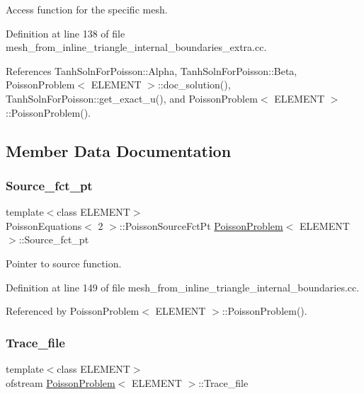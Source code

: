 Access function for the specific mesh. 



Definition at line 138 of file mesh\+\_\+from\+\_\+inline\+\_\+triangle\+\_\+internal\+\_\+boundaries\+\_\+extra.\+cc.



References Tanh\+Soln\+For\+Poisson\+::\+Alpha, Tanh\+Soln\+For\+Poisson\+::\+Beta, Poisson\+Problem$<$ E\+L\+E\+M\+E\+N\+T $>$\+::doc\+\_\+solution(), Tanh\+Soln\+For\+Poisson\+::get\+\_\+exact\+\_\+u(), and Poisson\+Problem$<$ E\+L\+E\+M\+E\+N\+T $>$\+::\+Poisson\+Problem().



\subsection{Member Data Documentation}
\mbox{\label{classPoissonProblem_a2ba5bb705abab012b72bbd7f4016d5fe}} 
\subsubsection{\texorpdfstring{Source\+\_\+fct\+\_\+pt}{Source\_fct\_pt}}
{\footnotesize\ttfamily template$<$class E\+L\+E\+M\+E\+NT$>$ \\
Poisson\+Equations$<$ 2 $>$\+::Poisson\+Source\+Fct\+Pt \hyperlink{classPoissonProblem}{Poisson\+Problem}$<$ E\+L\+E\+M\+E\+NT $>$\+::Source\+\_\+fct\+\_\+pt\hspace{0.3cm}{\ttfamily [private]}}



Pointer to source function. 



Definition at line 149 of file mesh\+\_\+from\+\_\+inline\+\_\+triangle\+\_\+internal\+\_\+boundaries.\+cc.



Referenced by Poisson\+Problem$<$ E\+L\+E\+M\+E\+N\+T $>$\+::\+Poisson\+Problem().

\mbox{\label{classPoissonProblem_a97e7fec0921ca588c6701b56ccf68474}} 
\subsubsection{\texorpdfstring{Trace\+\_\+file}{Trace\_file}}
{\footnotesize\ttfamily template$<$class E\+L\+E\+M\+E\+NT$>$ \\
ofstream \hyperlink{classPoissonProblem}{Poisson\+Problem}$<$ E\+L\+E\+M\+E\+NT $>$\+::Trace\+\_\+file\hspace{0.3cm}{\ttfamily [private]}}




